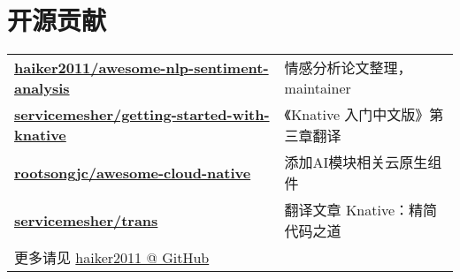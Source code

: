 \documentclass[]{deedy-resume-openfont}
\begin{document}
\begin{minipage}[t]{0.68\textwidth}
\section{开源贡献}
\begin{tabular}{ll}
\href{https://github.com/haiker2011/awesome-nlp-sentiment-analysis/commits?author=haiker2011}{\bf haiker2011/awesome-nlp-sentiment-analysis} & 情感分析论文整理，maintainer \\
\href{https://github.com/servicemesher/getting-started-with-knative/commits?author=haiker2011}{\bf servicemesher/getting-started-with-knative} & 《Knative 入门中文版》第三章翻译 \\
\href{https://github.com/rootsongjc/awesome-cloud-native/commits?author=haiker2011}{\bf rootsongjc/awesome-cloud-native} & 添加AI模块相关云原生组件 \\
\href{https://github.com/servicemesher/trans/commits?author=haiker2011}{\bf servicemesher/trans} & 翻译文章 Knative：精简代码之道 \\
更多请见 \href{https://github.com/haiker2011}{haiker2011 @ GitHub} & \\
\end{tabular}
\sectionsep


\end{minipage} 
\end{document}
